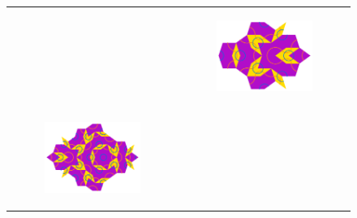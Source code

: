 \documentclass[
  oneside,
  11pt, a4paper,
  footinclude=true,
  headinclude=true,
  cleardoublepage=empty
]{scrbook}
\begin{document}
\begin{figure}[H]
\begin{tabular}{cc}
\begin{subfigure}[b]{0.4\textwidth}
             \end{subfigure}   &
             \begin{subfigure}[b]{0.4\textwidth}
             \centering
             \includegraphics[scale=0.4]{FatInflation3}
             \end{subfigure}   \\
             \begin{subfigure}[b]{0.4\textwidth}
             \centering
             \includegraphics[scale=0.4]{FatInflation4}
             \end{subfigure}   &
             \begin{subfigure}[b]{0.4\textwidth}
             \centering

\end{subfigure}
\end{tabular}
\end{figure}
\end{document}
